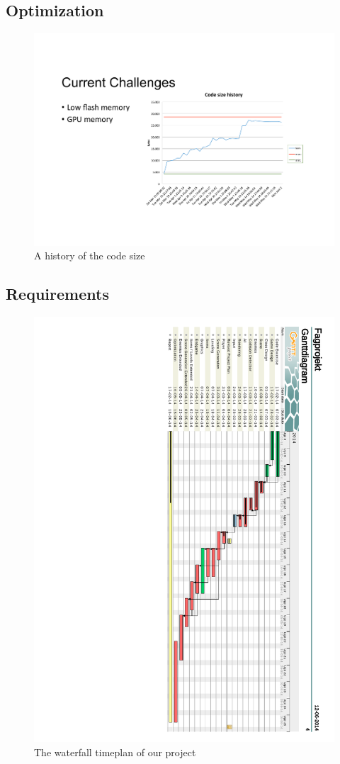 \documentclass[12pt]{report}
\begin{document}
\subsection{Optimization}
\begin{figure}[h]
  \centering
  \includegraphics[scale=0.8]{Figures/CodeSizeChart}
  \caption{A history of the code size}
  \label{fig:code_size}
\end{figure}
\newpage
\subsection{Requirements}
\begin{figure}[h]
  \centering
  \includegraphics[scale=0.55]{Figures/Tidsplan2}
  \caption{The waterfall timeplan of our project}
  \label{fig:Waterfall_chart}
\end{figure}
\end{document}

